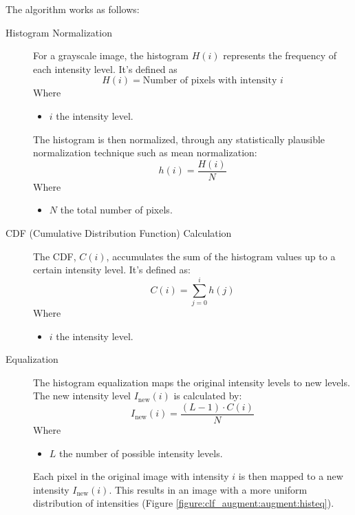 \documentclass[letterpaper]{article} %
\begin{document}
The algorithm works as follows:
\begin{description}
  \item[Histogram Normalization]
  For a grayscale image, the histogram $H(i)$ 
  represents the frequency of each intensity level. 
  It's defined as 
  \begin{equation*}
    H(i) = \text{Number of pixels with intensity $i$}
  \end{equation*}
  Where \begin{itemize}
    \item $i$ the intensity level.
  \end{itemize}

  The histogram is then normalized,
  through any statistically plausible normalization
  technique such as mean normalization:
  \begin{equation*}
    h(i) = \frac{H(i)}{N}
  \end{equation*}
  Where \begin{itemize}
    \item $N$ the total number of pixels.
  \end{itemize}

  \item[CDF (Cumulative Distribution Function) Calculation]
  The CDF, $C(i)$, accumulates the sum of the histogram values 
  up to a certain intensity level. It's defined as:
  \begin{equation*}
    C(i) = \sum_{j=0}^{i} h(j)
  \end{equation*}
  Where \begin{itemize}
    \item $i$ the intensity level.
  \end{itemize}

  \item[Equalization]
  The histogram equalization maps the original intensity levels to new levels. 
  The new intensity level $I_{\text{new}}(i)$ is calculated by:
  \begin{equation*}
    I_\text{new}(i) =  
      \frac{(L - 1) \cdot C(i)}{N}
  \end{equation*}
  Where \begin{itemize}
    \item $L$ the number of possible intensity levels.
  \end{itemize}

  Each pixel in the original image with intensity $i$ is then
  mapped to a new intensity $I_{\text{new}}(i)$. 
  This results in an image with a more uniform distribution of intensities 
  (Figure \ref{figure:clf_augment:augment:histeq}).
\end{description}
\end{document}
